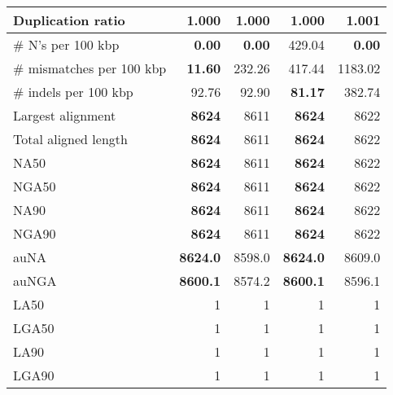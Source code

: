 \documentclass[12pt,a4paper]{article}
\begin{document}
\begin{table}[ht]
\begin{center}
\begin{tabular}{|l*{4}{|r}|}
Duplication ratio & {\bf 1.000} & {\bf 1.000} & {\bf 1.000} & 1.001 \\ \hline
\# N's per 100 kbp & {\bf 0.00} & {\bf 0.00} & 429.04 & {\bf 0.00} \\ \hline
\# mismatches per 100 kbp & {\bf 11.60} & 232.26 & 417.44 & 1183.02 \\ \hline
\# indels per 100 kbp & 92.76 & 92.90 & {\bf 81.17} & 382.74 \\ \hline
Largest alignment & {\bf 8624} & 8611 & {\bf 8624} & 8622 \\ \hline
Total aligned length & {\bf 8624} & 8611 & {\bf 8624} & 8622 \\ \hline
NA50 & {\bf 8624} & 8611 & {\bf 8624} & 8622 \\ \hline
NGA50 & {\bf 8624} & 8611 & {\bf 8624} & 8622 \\ \hline
NA90 & {\bf 8624} & 8611 & {\bf 8624} & 8622 \\ \hline
NGA90 & {\bf 8624} & 8611 & {\bf 8624} & 8622 \\ \hline
auNA & {\bf 8624.0} & 8598.0 & {\bf 8624.0} & 8609.0 \\ \hline
auNGA & {\bf 8600.1} & 8574.2 & {\bf 8600.1} & 8596.1 \\ \hline
LA50 & 1 & 1 & 1 & 1 \\ \hline
LGA50 & 1 & 1 & 1 & 1 \\ \hline
LA90 & 1 & 1 & 1 & 1 \\ \hline
LGA90 & 1 & 1 & 1 & 1 \\ \hline
\end{tabular}
\end{center}
\end{table}
\end{document}
